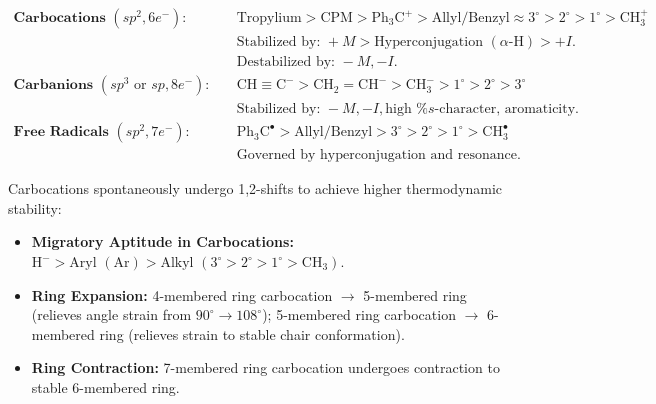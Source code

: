 \documentclass[10pt,a4paper]{article}
\begin{document}
\begin{formulabox}
\begin{align*}
  \textbf{Carbocations } (sp^2, 6e^-): \quad & \text{Tropylium} > \text{CPM} > \mathrm{Ph}_3\mathrm{C}^+ > \text{Allyl/Benzyl} \approx 3^\circ > 2^\circ > 1^\circ > \mathrm{CH}_3^+\\
  & \text{Stabilized by: } +M > \text{Hyperconjugation } (\alpha\text{-H}) > +I.\\
  & \text{Destabilized by: } -M, -I.\\
  \textbf{Carbanions } (sp^3 \text{ or } sp, 8e^-): \quad & \mathrm{CH\equiv C}^- > \mathrm{CH_2=CH}^- > \mathrm{CH}_3^- > 1^\circ > 2^\circ > 3^\circ\\
  & \text{Stabilized by: } -M, -I, \text{high \% } s\text{-character, aromaticity.}\\
  \textbf{Free Radicals } (sp^2, 7e^-): \quad & \mathrm{Ph}_3\mathrm{C}^\bullet > \text{Allyl/Benzyl} > 3^\circ > 2^\circ > 1^\circ > \mathrm{CH}_3^\bullet\\
  & \text{Governed by hyperconjugation and resonance.}
\end{align*}
\end{formulabox}

\begin{usecasebox}
Carbocations spontaneously undergo 1,2-shifts to achieve higher thermodynamic stability:
\begin{itemize}
  \item \textbf{Migratory Aptitude in Carbocations:} $\mathrm{H}^- > \text{Aryl } (\mathrm{Ar}) > \text{Alkyl } (3^\circ > 2^\circ > 1^\circ > \mathrm{CH}_3)$.
  \item \textbf{Ring Expansion:} 4-membered ring carbocation $\to$ 5-membered ring (relieves angle strain from $90^\circ \to 108^\circ$); 5-membered ring carbocation $\to$ 6-membered ring (relieves strain to stable chair conformation).
  \item \textbf{Ring Contraction:} 7-membered ring carbocation undergoes contraction to stable 6-membered ring.
\end{itemize}
\end{usecasebox}
\end{document}
